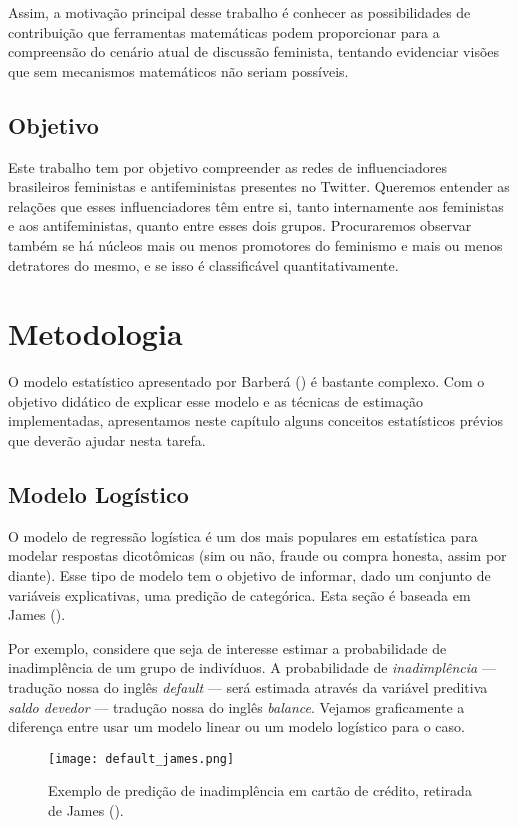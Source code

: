 \documentclass[
	12pt,				%
	openright,			%
	twoside,			%
	a4paper,			%
	english,			%
	brazil				%
	]{abntex2}
\begin{document}
 Assim, a motivação principal desse trabalho é conhecer as possibilidades de contribuição que ferramentas matemáticas podem proporcionar para a compreensão do cenário atual de discussão feminista, tentando evidenciar visões que sem mecanismos matemáticos não seriam possíveis.

 \section{Objetivo}
 Este trabalho tem por objetivo compreender as redes de influenciadores brasileiros feministas e antifeministas presentes no Twitter. Queremos entender as relações que esses influenciadores têm entre si, tanto internamente aos feministas e aos antifeministas, quanto entre esses dois grupos. Procuraremos observar também se há núcleos mais ou menos promotores do feminismo e mais ou menos detratores do mesmo, e se isso é classificável quantitativamente.
 
\chapter{Metodologia}
 O modelo estatístico apresentado por Barberá (\citeyear{barbera2015}) é bastante complexo. Com o objetivo didático de explicar esse modelo e as técnicas de estimação implementadas, apresentamos neste capítulo alguns conceitos estatísticos prévios que deverão ajudar nesta tarefa.

 \section{Modelo Logístico}
 O modelo de regressão logística é um dos mais populares em estatística para modelar respostas dicotômicas (sim ou não, fraude ou compra honesta, assim por diante). Esse tipo de modelo tem o objetivo de informar, dado um conjunto de variáveis explicativas, uma predição de categórica. Esta seção é baseada em James (\citeyear{james2013}).

 Por exemplo, considere que seja de interesse estimar a probabilidade de inadimplência de um grupo de indivíduos. A probabilidade de \textit{inadimplência} --- tradução nossa do inglês \emph{default} --- será estimada através da variável preditiva \textit{saldo devedor} --- tradução nossa do inglês \emph{balance}. Vejamos graficamente a diferença entre usar um modelo linear ou um modelo logístico para o caso.

 \begin{figure}[!htbp]
    \centering
    \texttt{[image: default\_james.png]}
    \caption{Exemplo de predição de inadimplência em cartão de crédito, retirada de James (\citeyear{james2013}).}
    \label{fig:default}
 \end{figure}
 
\end{document}
